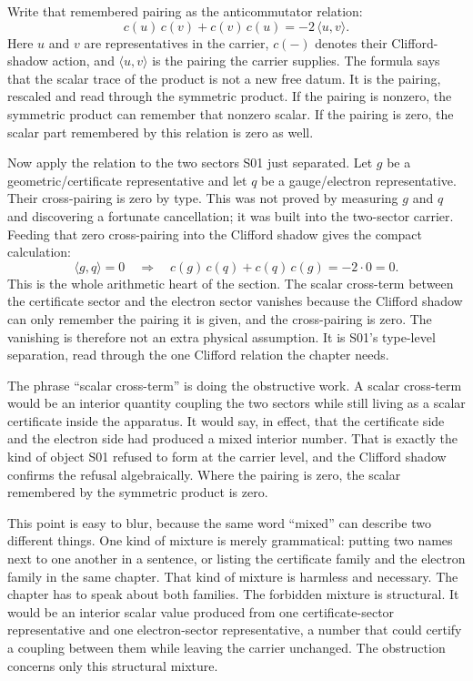 Write that remembered pairing as the anticommutator relation:
\[
  c(u)\,c(v) + c(v)\,c(u) = -2\,\langle u, v \rangle.
\]
Here \(u\) and \(v\) are representatives in the carrier, \(c(-)\) denotes their
Clifford-shadow action, and \(\langle u,v\rangle\) is the pairing the carrier
supplies. The formula says that the scalar trace of the product is not a new
free datum. It is the pairing, rescaled and read through the symmetric product.
If the pairing is nonzero, the symmetric product can remember that nonzero
scalar. If the pairing is zero, the scalar part remembered by this relation is
zero as well.

Now apply the relation to the two sectors S01 just separated. Let \(g\) be a
geometric/certificate representative and let \(q\) be a gauge/electron
representative. Their cross-pairing is zero by type. This was not proved by
measuring \(g\) and \(q\) and discovering a fortunate cancellation; it was built
into the two-sector carrier. Feeding that zero cross-pairing into the Clifford
shadow gives the compact calculation:
\[
  \langle g, q \rangle = 0
  \quad\Longrightarrow\quad
  c(g)\,c(q) + c(q)\,c(g) = -2 \cdot 0 = 0.
\]
This is the whole arithmetic heart of the section. The scalar cross-term
between the certificate sector and the electron sector vanishes because the
Clifford shadow can only remember the pairing it is given, and the cross-pairing
is zero. The vanishing is therefore not an extra physical assumption. It is S01's
type-level separation, read through the one Clifford relation the chapter needs.

The phrase ``scalar cross-term'' is doing the obstructive work. A scalar
cross-term would be an interior quantity coupling the two sectors while still
living as a scalar certificate inside the apparatus. It would say, in effect,
that the certificate side and the electron side had produced a mixed interior
number. That is exactly the kind of object S01 refused to form at the carrier
level, and the Clifford shadow confirms the refusal algebraically. Where the
pairing is zero, the scalar remembered by the symmetric product is zero.

This point is easy to blur, because the same word ``mixed'' can describe two
different things. One kind of mixture is merely grammatical: putting two names
next to one another in a sentence, or listing the certificate family and the
electron family in the same chapter. That kind of mixture is harmless and
necessary. The chapter has to speak about both families. The forbidden mixture
is structural. It would be an interior scalar value produced from one
certificate-sector representative and one electron-sector representative, a
number that could certify a coupling between them while leaving the carrier
unchanged. The obstruction concerns only this structural mixture.

